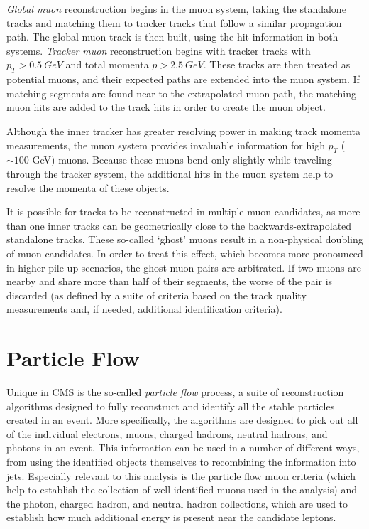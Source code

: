 \emph{Global muon} reconstruction begins in the muon system, taking the
standalone tracks and matching them to tracker tracks that follow a similar
propagation path. The global muon track is then built, using the hit information
in both systems. \emph{Tracker muon} reconstruction begins with tracker tracks
with $p_T > 0.5~GeV$ and total momenta $p > 2.5~GeV$. These tracks are then
treated as potential muons, and their expected paths are extended into the muon
system. If matching segments are found near to the extrapolated muon path, the
matching muon hits are added to the track hits in order to create the muon
object.

Although the inner tracker has greater resolving power in making track momenta
measurements, the muon system provides invaluable information for high $p_T$ ($\sim
100$ GeV) muons. Because these muons bend only slightly while traveling through
the tracker system, the additional hits in the muon system help to resolve the
momenta of these objects.

It is possible for tracks to be reconstructed in multiple muon candidates, as
more than one inner tracks can be geometrically close to the
backwards-extrapolated standalone tracks. These so-called `ghost' muons result
in a non-physical doubling of muon candidates. In order to treat this effect,
which becomes more pronounced in higher pile-up scenarios, the ghost muon pairs
are arbitrated. If two muons are nearby and share more than half of their
segments, the worse of the pair is discarded (as defined by a suite of
criteria based on the track quality measurements and, if needed, additional
identification criteria).

\section{Particle Flow}
Unique in CMS is the so-called \emph{particle flow} process, a suite of
reconstruction algorithms designed to fully reconstruct and identify all the
stable particles created in an event. More specifically, the algorithms are
designed to pick out all of the individual electrons, muons, charged hadrons,
neutral hadrons, and photons in an event. This information can be used in a
number of different ways, from using the identified objects themselves to
recombining the information into jets. Especially relevant to this analysis is
the particle flow muon criteria (which help to establish the collection of
well-identified muons used in the analysis) and the photon, charged hadron, and
neutral hadron collections, which are used to establish how much additional
energy is present near the candidate leptons.

